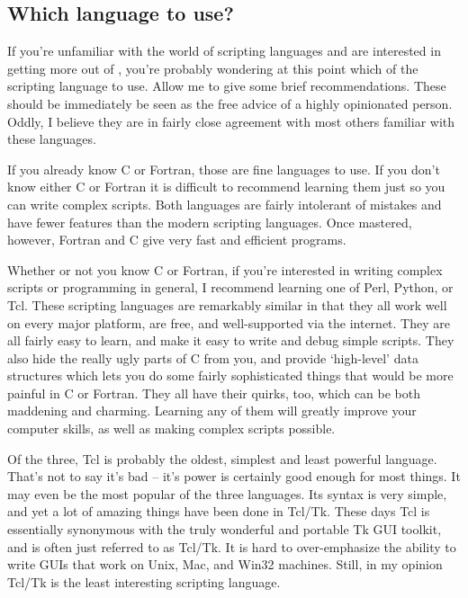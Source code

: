 \subsection{Which language to use?}\label{Ch:Scripting-langchoice}
{}

If you're unfamiliar with the world of scripting languages and are
interested in getting more out of {\ifeffit}, you're probably wondering at
this point which of the scripting language to use.  Allow me to give some
brief recommendations.  These should be immediately be seen as the free
advice of a highly opinionated person.  Oddly, I believe they are in fairly
close agreement with most others familiar with these languages.

If you already know C or Fortran, those are fine languages to use.  If you
don't know either C or Fortran it is difficult to recommend learning them
just so you can write complex {\ifeffit} scripts.  Both languages are
fairly intolerant of mistakes and have fewer features than the modern
scripting languages.  Once mastered, however, Fortran and C give very fast
and efficient programs.
{}

Whether or not you know C or Fortran, if you're interested in writing
complex {\ifeffit} scripts or programming in general, I recommend learning
one of Perl, Python, or Tcl.  These scripting languages are remarkably
similar in that they all work well on every major platform, are free, and
well-supported via the internet.  They are all fairly easy to learn, and
make it easy to write and debug simple scripts.  They also hide the really
ugly parts of C from you, and provide `high-level' data structures which
lets you do some fairly sophisticated things that would be more painful in
C or Fortran.  They all have their quirks, too, which can be both maddening
and charming.  Learning any of them will greatly improve your computer
skills, as well as making complex {\ifeffit} scripts possible.


{}
Of the three, Tcl\cite{TclBook} is probably the oldest, simplest and least
powerful language.  That's not to say it's bad -- it's power is certainly
good enough for most things.  It may even be the most popular of the three
languages. Its syntax is very simple, and yet a lot of amazing things have
been done in Tcl/Tk.  These days Tcl is essentially synonymous with the
truly wonderful and portable Tk GUI toolkit, and is often just referred to
as Tcl/Tk.  It is hard to over-emphasize the ability to write GUIs that
work on Unix, Mac, and Win32 machines.  Still, in my opinion Tcl/Tk is the
least interesting scripting language.

